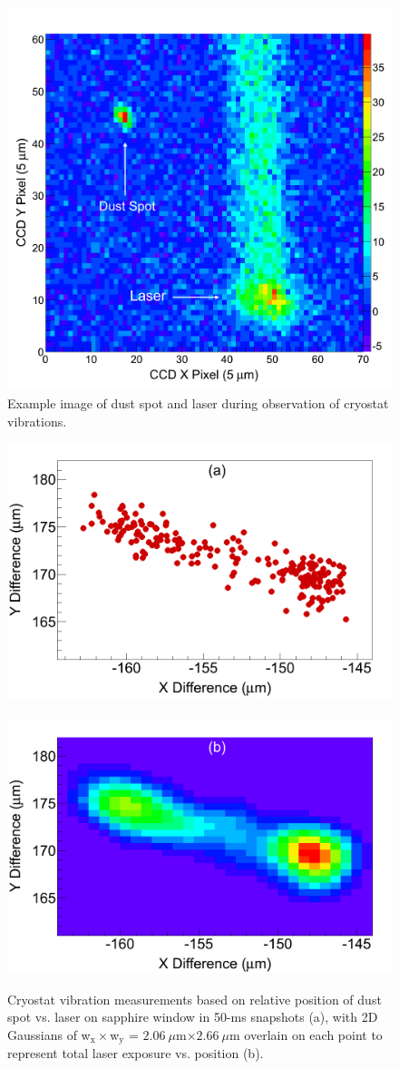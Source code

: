 \begin{figure} %
        \centering
                \includegraphics[width=.6\textwidth]{figures/image_dustspot.png}
                \caption{Example image of dust spot and laser during observation of cryostat vibrations.}
\label{fig:dustspot}
\end{figure}

\begin{figure} %
        \centering
                \includegraphics[width=.5\textwidth]{figures/cryovibes_a.png}
                ~
                \includegraphics[width=.5\textwidth]{figures/cryovibes_b.png}
                \caption{Cryostat vibration measurements based on relative position of dust spot vs. laser on sapphire window in 50-ms snapshots (a), with 2D Gaussians of w$_{\text{x}} \times $w$_{\text{y}}$ = $2.06~\mu$m$ \times 2.66~\mu$m overlain on each point to represent total laser exposure vs. position (b).}
\label{fig:cryovibe2D}
\end{figure}

